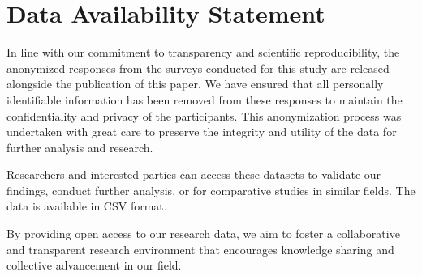 \section*{Data Availability Statement}
In line with our commitment to transparency and scientific reproducibility, the anonymized responses from the surveys conducted for this study are released alongside the publication of this paper. We have ensured that all personally identifiable information has been removed from these responses to maintain the confidentiality and privacy of the participants. This anonymization process was undertaken with great care to preserve the integrity and utility of the data for further analysis and research.

Researchers and interested parties can access these datasets to validate our findings, conduct further analysis, or for comparative studies in similar fields. The data is available in CSV format.

By providing open access to our research data, we aim to foster a collaborative and transparent research environment that encourages knowledge sharing and collective advancement in our field.